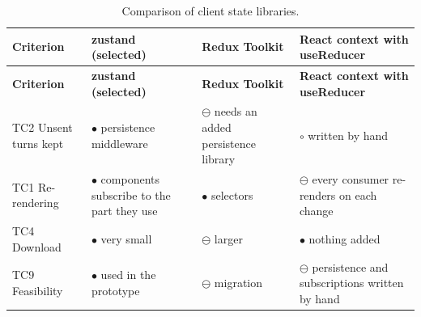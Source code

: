 {\small
\begin{longtable}{|>{\raggedright\arraybackslash}p{}|>{\raggedright\arraybackslash}p{}|>{\raggedright\arraybackslash}p{}|>{\raggedright\arraybackslash}p{}|}
\caption{Comparison of client state libraries.} \\
\hline
\textbf{Criterion} & \textbf{zustand (selected)} & \textbf{Redux Toolkit\cite{r174}} & \textbf{React context with useReducer} \\ \hline
\endfirsthead
\hline
\textbf{Criterion} & \textbf{zustand (selected)} & \textbf{Redux Toolkit\cite{r174}} & \textbf{React context with useReducer} \\ \hline
\endhead
TC2 Unsent turns kept & $\bullet$ persistence middleware\cite{r142} & $\ominus$ needs an added persistence library & $\circ$ written by hand \\ \hline
TC1 Re-\allowbreak{}rendering & $\bullet$ components subscribe to the part they use & $\bullet$ selectors & $\ominus$ every consumer re-renders on each change \\ \hline
TC4 Download & $\bullet$ very small & $\ominus$ larger & $\bullet$ nothing added \\ \hline
TC9 Feasibility & $\bullet$ used in the prototype & $\ominus$ migration & $\ominus$ persistence and subscriptions written by hand \\ \hline
\end{longtable}
}

